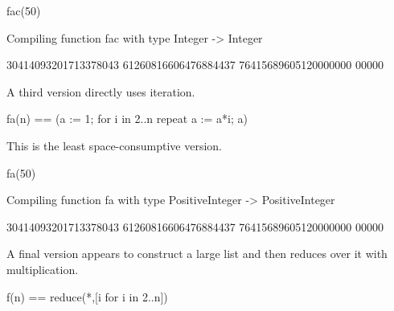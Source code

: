 {{{{{{{{\begin{xtc}
\begin{xtccomment}
\end{xtccomment}
\begin{spadsrc}
fac(50) 
\end{spadsrc}
\begin{MessageOutput}
   Compiling function fac with type Integer -> Integer 
\end{MessageOutput}
\begin{TeXOutput}
\begin{fricasmath}{5}
30414093201713378043 61260816606476884437 76415689605120000000 00000%
\end{fricasmath}
\end{TeXOutput}
\end{xtc}
\begin{xtc}
\begin{xtccomment}
A third version directly uses iteration.
\end{xtccomment}
\begin{spadsrc}
fa(n) == (a := 1; for i in 2..n repeat a := a*i; a) 
\end{spadsrc}
\end{xtc}
\begin{xtc}
\begin{xtccomment}
This is the least space-consumptive version.
\end{xtccomment}
\begin{spadsrc}
fa(50) 
\end{spadsrc}
\begin{MessageOutput}
   Compiling function fa with type PositiveInteger -> PositiveInteger 
\end{MessageOutput}
\begin{TeXOutput}
\begin{fricasmath}{7}
30414093201713378043 61260816606476884437 76415689605120000000 00000%
\end{fricasmath}
\end{TeXOutput}
\end{xtc}
\begin{xtc}
\begin{xtccomment}
A final version appears to construct a large list and then reduces over
it with multiplication.
\end{xtccomment}
\begin{spadsrc}
f(n) == reduce(*,[i for i in 2..n]) 
\end{spadsrc}
\end{xtc}
\begin{xtc}
\begin{xtccomment}

\end{xtccomment}
\end{xtc}}}}}}}}}
